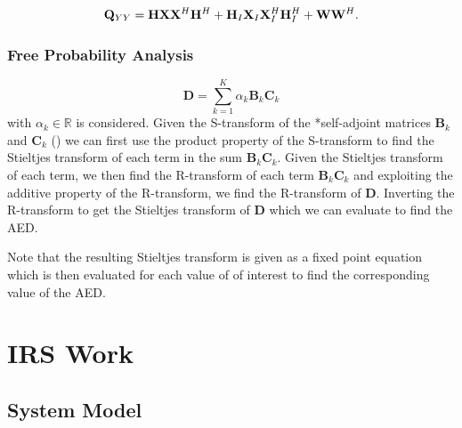 \documentclass[12pt,a4paper]{report}
\begin{document}
\begin{gather*}
\mathbf{Q}_{YY} =
\mathbf{H}\mathbf{X}\mathbf{X}^H\mathbf{H}^H + \mathbf{H}_I \mathbf{X}_I\mathbf{X}_I^H\mathbf{H}_I^H + \mathbf{W}\mathbf{W}^H.
\end{gather*}
\subsection{Free Probability Analysis}\label{decont_fpt}


\begin{equation}
\mathbf{D} = \sum_{k=1}^{K} \alpha_k \mathbf{B}_k \mathbf{C}_k
\end{equation}
with $\alpha_k \in \mathbb{R}$ is considered. Given the S-transform of the *self-adjoint matrices $\mathbf{B}_k $ and $\mathbf{C}_k$ (\cite{nica2006lectures}) we can first use the product property of the S-transform to find the Stieltjes transform of each term in the sum $\mathbf{B}_k \mathbf{C}_k$. Given the Stieltjes transform of each term, we then find the R-transform of each term $\mathbf{B}_k \mathbf{C}_k$ and exploiting the additive property of the R-transform, we find the R-transform of $\mathbf{D}$. Inverting the R-transform to get the Stieltjes transform of $\mathbf{D}$ which we can evaluate to find the AED.
\par
Note that the resulting Stieltjes transform is given as a fixed point equation which is then evaluated for each value of of interest to find the corresponding value of the AED. 

\chapter{IRS Work}

\section{System Model}\label{system_model}
\end{document}
